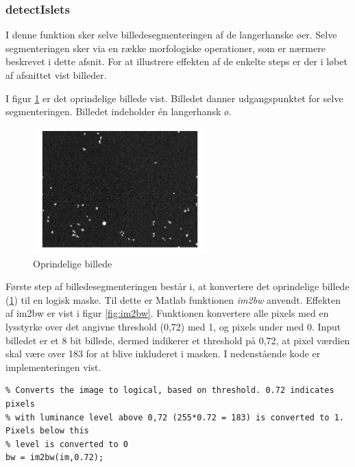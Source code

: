 \newpage
\subsubsection{detectIslets}
\label{subsub:IMdetectIslets}
I denne funktion sker selve billedesegmenteringen af de langerhanske øer. Selve segmenteringen sker via en række morfologiske operationer, som er nærmere beskrevet i dette afsnit. For at illustrere effekten af de enkelte steps er der i løbet af afsnittet vist billeder.

I figur \ref{fig:im} er det oprindelige billede vist. Billedet danner udgangspunktet for selve segmenteringen. Billedet indeholder én langerhansk ø. 


\begin{figure}[H]
	\centering
	\includegraphics[width=0.6\textwidth]{billeder/software/im.png}
	\caption{Oprindelige billede}
	\label{fig:im}
\end{figure}

Første step af billedesegmenteringen består i, at konvertere det oprindelige billede (\ref{fig:im}) til en logisk maske. Til dette er Matlab funktionen \textit{im2bw} anvendt. 
Effekten af im2bw er vist i figur \ref{fig:im2bw}. Funktionen konvertere alle pixels med en lysstyrke over det angivne threshold (0,72) med 1, og pixels under med 0. Input billedet er et 8 bit billede, dermed indikerer et threshold på 0,72, at pixel værdien skal være over 183 for at blive inkluderet i masken. I nedenstående kode er implementeringen vist.

\begin{lstlisting} 
% Converts the image to logical, based on threshold. 0.72 indicates pixels
% with luminance level above 0,72 (255*0.72 = 183) is converted to 1. Pixels below this 
% level is converted to 0 
bw = im2bw(im,0.72);
\end{lstlisting} 

